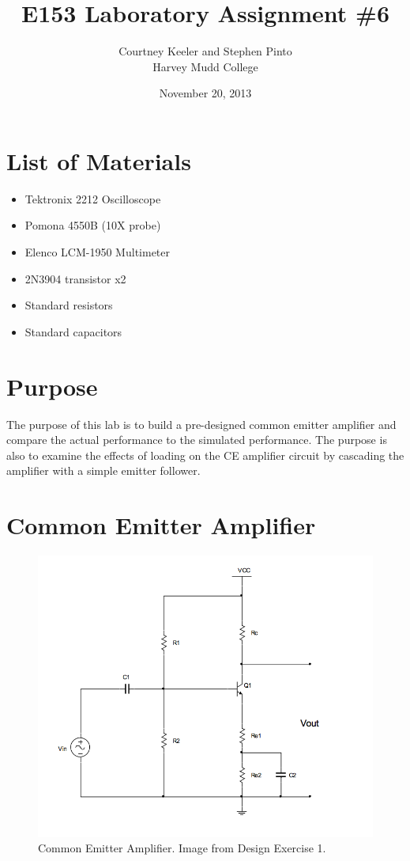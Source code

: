 \documentclass[12pt,letterpaper]{report}
\newlength \figwidth
\begin{document}
\title{E153 Laboratory Assignment \#6}
\author{Courtney Keeler and Stephen Pinto\\
Harvey Mudd College}
\date{November 20, 2013}
\maketitle

\section*{List of Materials}
\begin{itemize}
	\item Tektronix 2212 Oscilloscope
	\item Pomona 4550B (10X probe)
	\item Elenco LCM-1950 Multimeter
	\item 2N3904 transistor x2
	\item Standard resistors
	\item Standard capacitors
\end{itemize}

\section*{Purpose}
The purpose of this lab is to build a pre-designed common emitter amplifier and compare the actual performance to the simulated performance. The purpose is also to examine the effects of loading on the CE amplifier circuit by cascading the amplifier with a simple emitter follower.

\section*{Common Emitter Amplifier}
\begin{figure}[H]
\centering
\includegraphics[width=\figwidth, keepaspectratio=true]{lab6_images/cea.png}
\caption{Common Emitter Amplifier. Image from Design Exercise 1.}
\label{fig:cea}
\end{figure}
\end{document}
